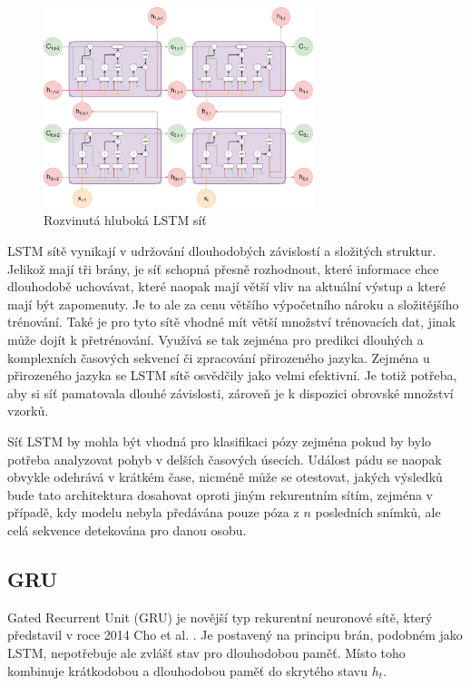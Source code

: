 \begin{figure}
    \centering
    \includegraphics[width=0.70\textwidth]{Figures/LSTM_deep.pdf}
    \caption{Rozvinutá hluboká LSTM síť}
    \label{fig:lstm_deep}
\end{figure}

LSTM sítě vynikají v udržování dlouhodobých závislostí a složitých struktur.
Jelikož mají tři brány, je síť schopná přesně rozhodnout, které informace chce
dlouhodobě uchovávat, které naopak mají větší vliv na aktuální výstup a které
mají být zapomenuty. Je to ale za cenu většího výpočetního nároku a
složitějšího trénování. Také je pro tyto sítě vhodné mít větší množství
trénovacích dat, jinak může dojít k přetrénování. Využívá se tak zejména pro
predikci dlouhých a komplexních časových sekvencí či zpracování přirozeného
jazyka. Zejména u přirozeného jazyka se LSTM sítě osvědčily jako velmi
efektivní. Je totiž potřeba, aby si síť pamatovala dlouhé závislosti, zároveň
je k dispozici obrovské množství vzorků.

Síť LSTM by mohla být vhodná pro klasifikaci pózy zejména pokud by bylo potřeba
analyzovat pohyb v delších časových úsecích. Událost pádu se naopak obvykle
odehrává v krátkém čase, nicméně může se otestovat, jakých výsledků bude tato
architektura dosahovat oproti jiným rekurentním sítím, zejména v případě, kdy
modelu nebyla předávána pouze póza z $n$ posledních snímků, ale celá sekvence
detekována pro danou osobu.

\subsection{GRU}

Gated Recurrent Unit (GRU) je novější typ rekurentní neuronové sítě, který
představil v roce 2014 Cho et al. \cite{gru}. Je postavený na principu brán,
podobném jako LSTM, nepotřebuje ale zvlášť stav pro dlouhodobou paměť. Místo
toho kombinuje krátkodobou a dlouhodobou paměť do skrytého stavu $h_t$.

